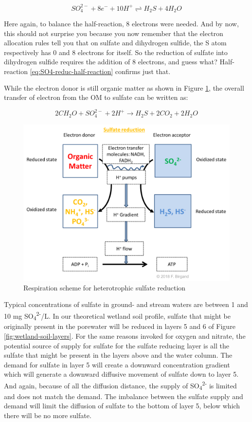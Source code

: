 \documentclass[]{book}
\theoremstyle{definition}
\theoremstyle{definition}
\theoremstyle{definition}
\theoremstyle{remark}
\begin{document}
\begin{equation}
SO_4^{2-} + 8 e^- + 10 H^+ \rightleftharpoons H_2S + 4 H_2O 
\label{eq:SO4-reduc-half-reaction}
\end{equation}

Here again, to balance the half-reaction, 8 electrons were needed. And
by now, this should not surprise you because you now remember that the
electron allocation rules tell you that on sulfate and dihydrogen
sulfide, the S atom respectively has 0 and 8 electrons for itself. So
the reduction of sulfate into dihydrogen sulfide requires the addition
of 8 electrons, and guess what? Half-reaction
\eqref{eq:SO4-reduc-half-reaction} confirms just that.

While the electron donor is still organic matter as shown in Figure
\ref{fig:SO4-resp}, the overall transfer of electron from the OM to
sulfate can be written as:

\begin{equation}
2 CH_2O + SO_4^{2-} + 2 H^+ \rightarrow H_2S + 2 CO_2  + 2 H_2O 
\label{eq:SO4-reduc}
\end{equation}

\begin{figure}

{\centering \includegraphics[width=0.75\linewidth]{pictures/respiration-OM-SO4} 

}

\caption{Respiration scheme for heterotrophic sulfate reduction}\label{fig:SO4-resp}
\end{figure}

Typical concentrations of sulfate in ground- and stream waters are
between 1 and 10 mg SO\textsubscript{4}\textsuperscript{2-}/L. In our
theoretical wetland soil profile, sulfate that might be originally
present in the porewater will be reduced in layers 5 and 6 of Figure
\ref{fig:wetland-soil-layers}. For the same reasons invoked for oxygen
and nitrate, the potential source of supply for sulfate for the sulfate
reducing layer is all the sulfate that might be present in the layers
above and the water column. The demand for sulfate in layer 5 will
create a downward concentration gradient which will generate a downward
diffusive movement of sulfate down to layer 5. And again, because of all
the diffusion distance, the supply of
SO\textsubscript{4}\textsuperscript{2-} is limited and does not match
the demand. The imbalance between the sulfate supply and demand will
limit the diffusion of sulfate to the bottom of layer 5, below which
there will be no more sulfate.
\end{document}
